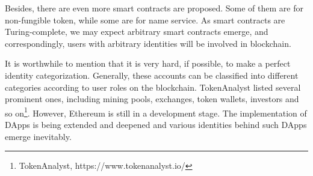 
Besides, there are even more
smart contracts are proposed. Some of them are for non-fungible token, while
some are for name service. As smart
contracts are Turing-complete, we may expect arbitrary smart contracts emerge,
and correspondingly, users with arbitrary identities will be involved in
blockchain.

It is worthwhile to mention that it is very hard, if possible, to make a perfect identity categorization. Generally, these accounts can be classified into different categories according to user roles on the blockchain. TokenAnalyst listed several prominent ones, including mining pools, exchanges, token wallets, investors and so on\footnote{TokenAnalyst, https://www.tokenanalyst.io/}.
However, Ethereum is still in a development stage. The implementation of DApps is being extended and deepened and various identities behind such DApps emerge inevitably.




